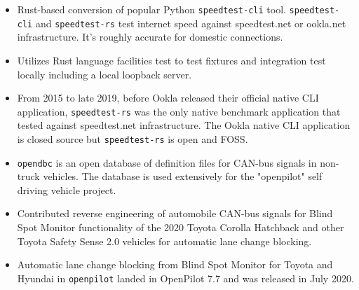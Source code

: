 \documentclass[10pt,letter,ragged2e]{altacv}
\begin{document}
\begin{paracol}{2}

\begin{itemize}
\item Rust-based conversion of popular Python \texttt{speedtest-cli} tool. \texttt{speedtest-cli} and \texttt{speedtest-rs} test internet speed against speedtest.net or ookla.net infrastructure. It's roughly accurate for domestic connections.
\item Utilizes Rust language facilities test to test fixtures and integration test locally including a local loopback server.
\item From 2015 to late 2019, before Ookla released their official native CLI application, \texttt{speedtest-rs} was the only native benchmark application that tested against speedtest.net infrastructure. The Ookla native CLI application is closed source but \texttt{speedtest-rs} is open and FOSS.
\end{itemize}

\divider


\begin{itemize}
\item \texttt{opendbc} is an open database of definition files for CAN-bus signals in non-truck vehicles. The database is used extensively for the "openpilot" self driving vehicle project.
\item Contributed reverse engineering of automobile CAN-bus signals for Blind Spot Monitor functionality of the 2020 Toyota Corolla Hatchback and other Toyota Safety Sense 2.0 vehicles for automatic lane change blocking.
\item Automatic lane change blocking from Blind Spot Monitor for Toyota and Hyundai in \texttt{openpilot} landed in OpenPilot 7.7 and was released in July 2020.
\end{itemize}



\divider



\end{paracol}
\end{document}
